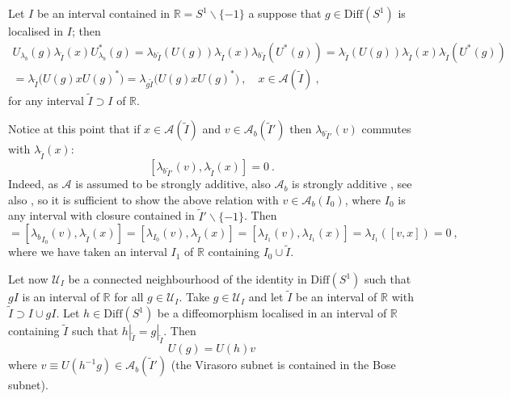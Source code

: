 \documentclass[11pt]{article}
\def\l{\lambda}
\def\setminus{\smallsetminus}
\def\A{{\cal A}}
\def\U{{\cal U}}
\def\Diff{{\rm Diff}}
\def\setminus{\smallsetminus}
\def\Diff{{\mathrm {Diff}}}
\def\A{{\mathcal A}}
\def\U{{\mathcal U}}
\begin{document}
Let $I$ be an interval contained in $\mathbb R = S^1\setminus\{-1\}$ a suppose that $g\in\Diff(S^1)$ is localised in $I$; then
\begin{multline*}
U_{\l_b}(g)\l_{\tilde I}(x)U^*_{\l_b}(g) = {\l_b}_{\tilde I}(U(g))\l_{\tilde I}(x){\l_b}_{\tilde I}(U^*(g))
= {\l}_{\tilde I}(U(g))\l_{\tilde I}(x){\l}_{\tilde I}(U^*(g))\\
= \l_{\tilde I}\big(U(g)xU(g)^*\big)
= \l_{g\tilde I}\big(U(g)xU(g)^*\big)\ ,
\quad x\in\A(\tilde I)\ ,
\end{multline*}
for any interval $\tilde I\supset I$ of $\mathbb R$. 

Notice at this point that if $x\in\A(\tilde I)$ and $v\in\A_b(\tilde I')$ then ${\l_b}_{\tilde I'}(v)$ commutes with $\l_{\tilde I}(x)$:
\[
[{\l_b}_{\tilde I'}(v),\l_{\tilde I}(x)]=0\ .
\]
Indeed, as $\A$ is assumed to be strongly additive, also $\A_b$ is strongly additive \cite{X01}, see also \cite{L03}, so it is sufficient to show the above relation with $v\in\A_b(I_0)$,  where $I_0$ is any interval with closure contained in $\tilde I'\setminus \{-1\}$. Then
\begin{equation*}
[{\l_b}_{\tilde I'}(v),\l_{\tilde I}(x)] =[{\l_b}_{I_0}(v),\l_{\tilde I}(x)]
= [{\l}_{I_0}(v),\l_{\tilde I}(x)] 
= [{\l}_{I_1}(v),\l_{I_1}(x)] 
= {\l}_{I_1}([v,x]) = 0\ ,
\end{equation*}
where we have taken an interval $I_1$ of $\mathbb R$ containing $I_0\cup\tilde I$.

Let now $\U_I$ be a connected neighbourhood of the identity in $\Diff(S^1)$ such that $gI$ is an interval of $\mathbb R$ for all $g\in\U_I$. Take $g\in\U_I$ and let $\tilde I$ be an interval of $\mathbb R$ with $\tilde I\supset I\cup gI$. Let $h\in \Diff(S^1)$ be a diffeomorphism localised in an interval of $\mathbb R$ containing $\tilde I$ such that $h|_{\tilde I} = g|_{\tilde I}$. Then
\[
U(g) = U(h)v
\]
where $v\equiv U(h^{-1}g )\in \A_b(\tilde I')$ (the Virasoro subnet is contained in the Bose subnet).
\end{document}
